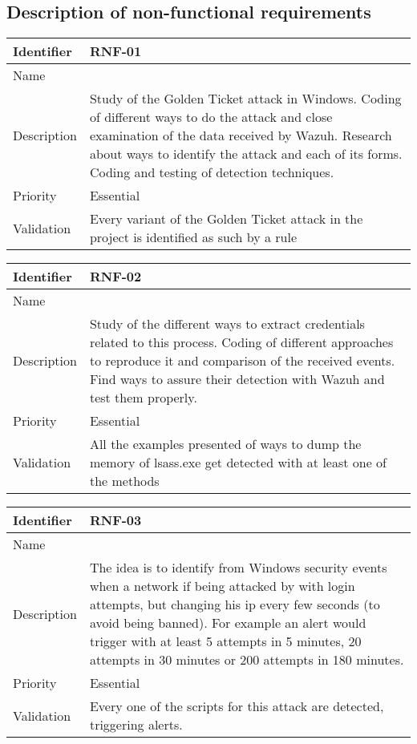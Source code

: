 \subsection{Description of non-functional requirements}
\begin{table}[H]
	\begin{tabularx}{\textwidth}{|l|X|}
		\hline
		\rowcolor{gray!30}
		Identifier & \textbf{RNF-01} \\ \hline
		Name & \RNFuno \\ \hline
		Description & Study of the Golden Ticket attack in Windows. Coding of different ways to do the attack and close examination of the data received by Wazuh. Research about ways to identify the attack and each of its forms. Coding and testing of detection techniques. \\ \hline
		Priority & Essential \\ \hline
		Validation & Every variant of the Golden Ticket attack in the project is identified as such by a rule \\ \hline
	\end{tabularx}
\end{table}
\begin{table}[H]
	\begin{tabularx}{\textwidth}{|l|X|}
		\hline
		\rowcolor{gray!30}
		Identifier & \textbf{RNF-02} \\ \hline
		Name & \RNFdos \\ \hline
		Description & Study of the different ways to extract credentials related to this process. Coding of different approaches to reproduce it and comparison of the received events. Find ways to assure their detection with Wazuh and test them properly. \\ \hline
		Priority & Essential \\ \hline
		Validation & All the examples presented of ways to dump the memory of lsass.exe get detected with at least one of the methods \\ \hline
	\end{tabularx}
\end{table}
\begin{table}[H]
	\begin{tabularx}{\textwidth}{|l|X|}
		\hline
		\rowcolor{gray!30}
		Identifier & \textbf{RNF-03} \\ \hline
		Name & \RNFtres \\ \hline
		Description & The idea is to identify from Windows security events when a network if being attacked by with login attempts, but changing his ip every few seconds (to avoid being banned). For example an alert would trigger with at least 5 attempts in 5 minutes, 20 attempts in 30 minutes or 200 attempts in 180 minutes. \\ \hline
		Priority & Essential \\ \hline
		Validation & Every one of the scripts for this attack are detected, triggering alerts. \\ \hline
	\end{tabularx}
\end{table}
